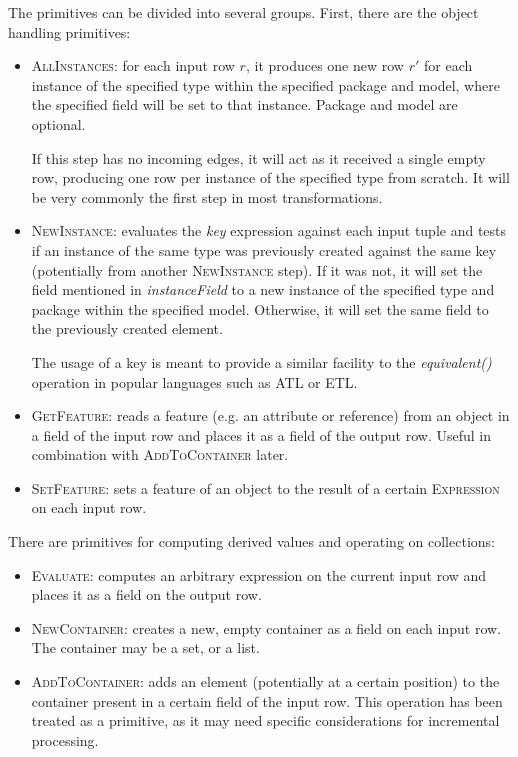\documentclass[a4paper]{scrartcl}
\newcommand*{\class}[1]{\textsc{#1}}
\begin{document}

The primitives can be divided into several groups. First, there are
the object handling primitives:

\begin{itemize}
\item \class{AllInstances}: for each input row $r$, it produces one
  new row $r'$ for each instance of the specified type within the
  specified package and model, where the specified field will be set
  to that instance. Package and model are optional.

  If this step has no incoming edges, it will act as it received a
  single empty row, producing one row per instance of the specified
  type from scratch. It will be very commonly the first step in most
  transformations.

\item \class{NewInstance}: evaluates the \emph{key} expression against
  each input tuple and tests if an instance of the same type was
  previously created against the same key (potentially from another
  \class{NewInstance} step). If it was not, it will set the field
  mentioned in \emph{instanceField} to a new instance of the specified
  type and package within the specified model. Otherwise, it will set
  the same field to the previously created element.

  The usage of a key is meant to provide a similar facility to the
  \emph{equivalent()} operation in popular languages such as ATL or
  ETL.

\item \class{GetFeature}: reads a feature (e.g. an attribute or
  reference) from an object in a field of the input row and places it
  as a field of the output row. Useful in combination with
  \class{AddToContainer} later.

\item \class{SetFeature}: sets a feature of an object to the result of
  a certain \class{Expression} on each input row.
\end{itemize}

There are primitives for computing derived values and operating on
collections:

\begin{itemize}
\item \class{Evaluate}: computes an arbitrary expression on the
  current input row and places it as a field on the output row.

\item \class{NewContainer}: creates a new, empty container as a field
  on each input row. The container may be a set, or a list.

\item \class{AddToContainer}: adds an element (potentially at a
  certain position) to the container present in a certain field of the
  input row. This operation has been treated as a primitive, as it may
  need specific considerations for incremental processing.
\end{itemize}
\end{document}
